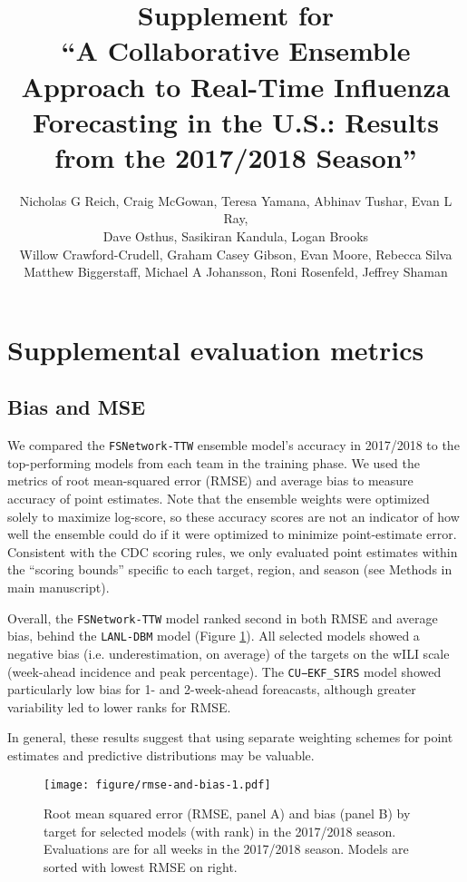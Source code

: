 \documentclass{article}\usepackage[]{graphicx}\usepackage[]{color}
\title{Supplement for\\``A Collaborative Ensemble Approach to Real-Time Influenza Forecasting in the U.S.: Results from the 2017/2018 Season''}
\author{Nicholas G Reich, Craig McGowan, Teresa Yamana, Abhinav Tushar, Evan L Ray,\\
Dave Osthus, Sasikiran Kandula, Logan Brooks\\
Willow Crawford-Crudell, Graham Casey Gibson, Evan Moore, Rebecca Silva\\Matthew Biggerstaff, Michael A Johansson, Roni Rosenfeld, Jeffrey Shaman}
\begin{document}
\maketitle





\section{Supplemental evaluation metrics}

\subsection{Bias and MSE}

We compared the {\tt FSNetwork-TTW} ensemble model's accuracy in 2017/2018 to the top-performing models from each team in the training phase. 
We used the metrics of root mean-squared error (RMSE) and average bias to measure accuracy of point estimates.
Note that the ensemble weights were optimized solely to maximize log-score, so these accuracy scores are not an indicator of how well the ensemble could do if it were optimized to minimize point-estimate error.
Consistent with the CDC scoring rules, we only evaluated point estimates within the ``scoring bounds'' specific to each target, region, and season (see Methods in main manuscript).

Overall, the {\tt FSNetwork-TTW} model ranked second in both RMSE and average bias, behind the {\tt LANL-DBM} model (Figure \ref{fig:bias-rmse}).
All selected models showed a negative bias (i.e. underestimation, on average) of the targets on the wILI scale (week-ahead incidence and peak percentage).
The {\tt CU−EKF\_SIRS} model showed particularly low bias for 1- and 2-week-ahead foreacasts, although greater variability led to lower ranks for RMSE.

In general, these results suggest that using separate weighting schemes for point estimates and predictive distributions may be valuable.

\begin{figure}[htbp]
\begin{center}
\texttt{[image: figure/rmse-and-bias-1.pdf]}
\caption{Root mean squared error (RMSE, panel A) and bias (panel B) by target for selected models (with rank) in the 2017/2018 season. Evaluations are for all weeks in the 2017/2018 season. Models are sorted with lowest RMSE on right.}
\label{fig:bias-rmse}
\end{center}
\end{figure}
\end{document}
